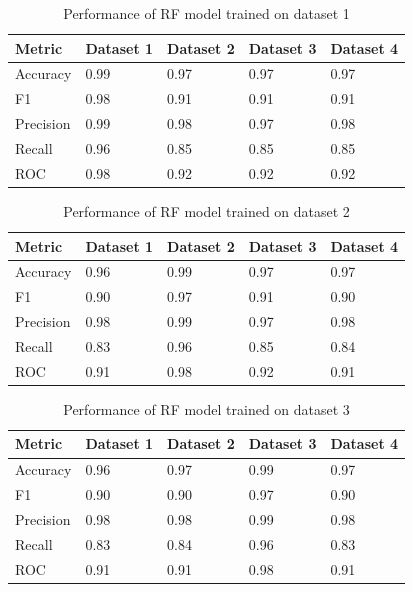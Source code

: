 \begin{table}[hbt]
\caption{Performance of RF model trained on dataset 1}\label{tab:performance_of_rf_model_trained_on_dataset_1}
\begin{tabular*}{\tblwidth}{@{}LLLLL@{}}
\toprule
    Metric & Dataset 1 & Dataset 2 & Dataset 3 & Dataset 4 \\
\midrule
    Accuracy & 0.99 & 0.97 & 0.97 & 0.97 \\
    F1 & 0.98 & 0.91 & 0.91 & 0.91 \\
    Precision & 0.99 & 0.98 & 0.97 & 0.98 \\
    Recall & 0.96 & 0.85 & 0.85 & 0.85 \\
    ROC & 0.98 & 0.92 & 0.92 & 0.92 \\
\bottomrule
\end{tabular*}
\end{table}

\begin{table}[hbt]
\caption{Performance of RF model trained on dataset 2}\label{tab:performance_of_rf_model_trained_on_dataset_2}
\begin{tabular*}{\tblwidth}{@{}LLLLL@{}}
\toprule
    Metric & Dataset 1 & Dataset 2 & Dataset 3 & Dataset 4 \\
\midrule
    Accuracy & 0.96 & 0.99 & 0.97 & 0.97 \\
    F1 & 0.90 & 0.97 & 0.91 & 0.90 \\
    Precision & 0.98 & 0.99 & 0.97 & 0.98 \\
    Recall & 0.83 & 0.96 & 0.85 & 0.84 \\
    ROC & 0.91 & 0.98 & 0.92 & 0.91 \\
\bottomrule
\end{tabular*}
\end{table}

\begin{table}[hbt]
\caption{Performance of RF model trained on dataset 3}\label{tab:performance_of_rf_model_trained_on_dataset_3}
\begin{tabular*}{\tblwidth}{@{}LLLLL@{}}
\toprule
    Metric & Dataset 1 & Dataset 2 & Dataset 3 & Dataset 4 \\
\midrule
    Accuracy & 0.96 & 0.97 & 0.99 & 0.97 \\
    F1 & 0.90 & 0.90 & 0.97 & 0.90 \\
    Precision & 0.98 & 0.98 & 0.99 & 0.98 \\
    Recall & 0.83 & 0.84 & 0.96 & 0.83 \\
    ROC & 0.91 & 0.91 & 0.98 & 0.91 \\
\bottomrule
\end{tabular*}
\end{table}

